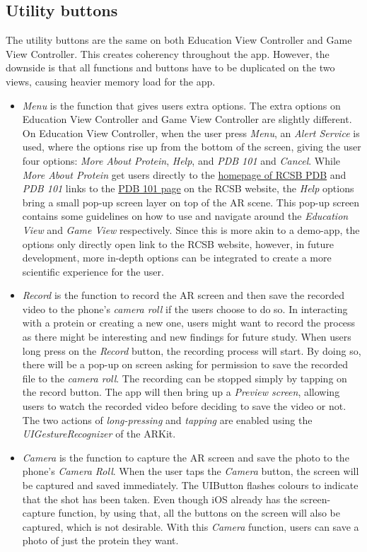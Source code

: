 \subsection{Utility buttons}
The utility buttons are the same on both Education View Controller and Game View Controller. This creates coherency throughout the app. However, the downside is that all functions and buttons have to be duplicated on the two views, causing heavier memory load for the app. 
\begin{itemize}
	\item \emph{Menu} is the function that gives users extra options. The extra options on Education View Controller and Game View Controller are slightly different. On Education View Controller, when the user press \emph{Menu}, an \emph{Alert Service} is used, where the options rise up from the bottom of the screen, giving the user four options: \emph{More About Protein}, \emph{Help}, and \emph{PDB 101} and \emph{Cancel}. While \emph{More About Protein} get users directly to the \href{http://rcsb.org}{homepage of RCSB PDB} and \emph{PDB 101} links to the \href{http://pdb101.rcsb.org}{PDB 101 page} on the RCSB website, the \emph{Help} options bring a small pop-up screen layer on top of the AR scene. This pop-up screen contains some guidelines on how to use and navigate around the \emph{Education View} and \emph{Game View} respectively. 
Since this is more akin to a demo-app, the options only directly open link to the RCSB website, however, in future development, more in-depth options can be integrated to create a more scientific experience for the user. 
	\item \emph{Record} is the function to record the AR screen and then save the recorded video to the phone’s \emph{camera roll} if the users choose to do so. In interacting with a protein or creating a new one, users might want to record the process as there might be interesting and new findings for future study. When users long press on the \emph{Record} button, the recording process will start. By doing so, there will be a pop-up on screen asking for permission to save the recorded file to the \emph{camera roll}. The recording can be stopped simply by tapping on the record button. The app will then bring up a \emph{Preview screen}, allowing users to watch the recorded video before deciding to save the video or not. The two actions of \emph{long-pressing} and \emph{tapping} are enabled using the \emph{UIGestureRecognizer} of the ARKit. 
	\item \emph{Camera} is the function to capture the AR screen and save the photo to the phone’s \emph{Camera Roll}. When the user taps the \emph{Camera} button, the screen will be captured and saved immediately. The UIButton flashes colours to indicate that the shot has been taken.  Even though iOS already has the screen-capture function, by using that, all the buttons on the screen will also be captured, which is not desirable. With this \emph{Camera} function, users can save a photo of just the protein they want. 

\end{itemize}

